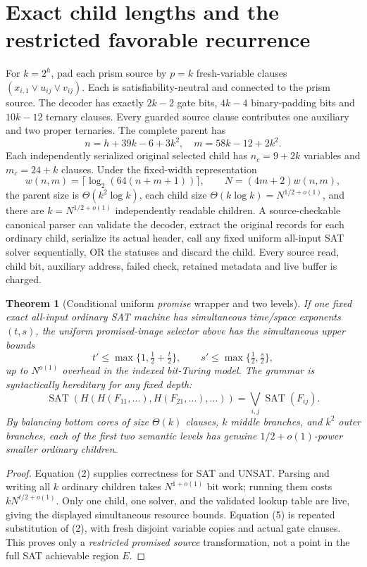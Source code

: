 \documentclass[11pt]{article}
\newtheorem{theorem}{Theorem}
\newcommand{\SAT}{\operatorname{SAT}}
\begin{document}
\section{Exact child lengths and the restricted favorable recurrence}
For \(k=2^h\), pad each prism source by \(p=k\) fresh-variable clauses \((x_{i,1}\vee u_{ij}\vee v_{ij})\). Each is satisfiability-neutral and connected to the prism source. The decoder has exactly \(2k-2\) gate bits, \(4k-4\) binary-padding bits and \(10k-12\) ternary clauses. Every guarded source clause contributes one auxiliary and two proper ternaries. The complete parent has
\[
\boxed{n=h+39k-6+3k^2,\quad m=58k-12+2k^2.}\tag{3}
\]
Each independently serialized original selected child has \(n_c=9+2k\) variables and \(m_c=24+k\) clauses. Under the fixed-width representation
\[
w(n,m)=\lceil\log_2(64(n+m+1))\rceil,\qquad
N=(4m+2)w(n,m),
\]
the parent size is \(\Theta(k^2\log k)\), each child size
\(\Theta(k\log k)=N^{1/2+o(1)}\), and there are
\(k=N^{1/2+o(1)}\) independently readable children.
A source-checkable canonical parser can validate the decoder,
extract the original records for each ordinary child, serialize its
actual header, call any fixed uniform all-input SAT solver sequentially,
OR the statuses and discard the child. Every source read, child bit,
auxiliary address, failed check, retained metadata and live buffer is charged.

\begin{theorem}[Conditional uniform \emph{promise} wrapper and two levels]
If one fixed exact all-input ordinary SAT machine has simultaneous
time/space exponents \((t,s)\), the uniform promised-image selector
above has the simultaneous upper bounds
\[
t'\le\max\{1,\tfrac12+\tfrac t2\},\qquad
s'\le\max\{\tfrac12,\tfrac s2\},\tag{4}
\]
up to \(N^{o(1)}\) overhead in the indexed bit-Turing model.
The grammar is syntactically hereditary for any fixed depth:
\[
\SAT(H(H(F_{11},\ldots),H(F_{21},\ldots),\ldots))
=\bigvee_{i,j}\SAT(F_{ij}).\tag{5}
\]
By balancing bottom cores of size \(\Theta(k)\) clauses, \(k\) middle
branches, and \(k^2\) outer branches, each of the first two semantic
levels has genuine \(1/2+o(1)\)-power smaller ordinary children.
\end{theorem}
\begin{proof}
Equation (2) supplies correctness for SAT and UNSAT. Parsing and writing
all \(k\) ordinary children takes \(N^{1+o(1)}\) bit work; running them costs
\(kN^{t/2+o(1)}\). Only one child, one solver, and the validated lookup
table are live, giving the displayed simultaneous resource bounds.
Equation (5) is repeated substitution of (2), with fresh disjoint variable
copies and actual gate clauses. This proves only a \emph{restricted promised
source} transformation, not a point in the full SAT achievable region \(E\).
\end{proof}
\end{document}
